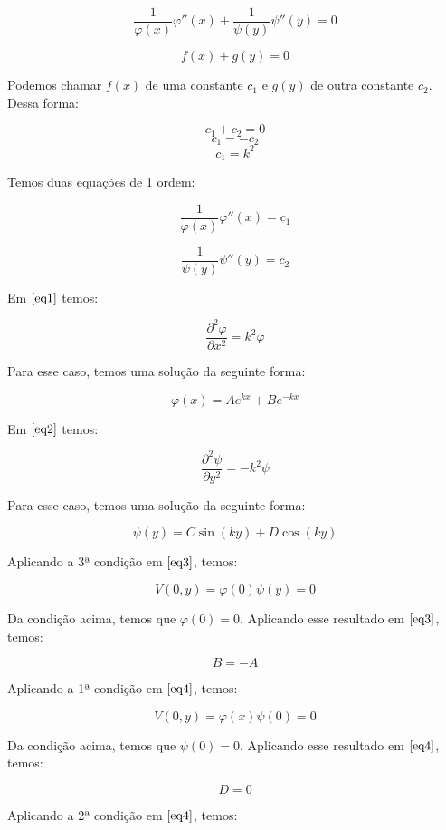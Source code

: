 \documentclass[11pt,a4paper]{article}
\begin{document}
\begin{enumerate}
\begin{enumerate}
$$\displaystyle\dfrac{1}{\varphi (x)}\varphi'' (x) + \displaystyle\dfrac{1}{\psi (y)}\psi'' (y) = 0$$

$$f(x) + g(y) = 0$$

Podemos chamar $f(x)$ de uma constante $c_1$ e $g(y)$ de outra constante $c_2$. Dessa forma:

$$c_1 + c_2 = 0$$
$$c_1 = -c_2$$
$$c_1 = k^2$$

Temos duas equações de 1 ordem:

\begin{equation}
\displaystyle\dfrac{1}{\varphi (x)}\varphi'' (x) = c_1
\label{eq1}
\end{equation}

\begin{equation}
\displaystyle\dfrac{1}{\psi (y)}\psi'' (y) = c_2
\label{eq2}
\end{equation}

Em $\ref{eq1}$ temos:

$$\displaystyle\dfrac{\partial ^2 \varphi}{\partial x^2} = k^2\varphi$$

Para esse caso, temos uma solução da seguinte forma:

\begin{equation}
\varphi (x) = A e^{kx} + B e^{-kx}
\label{eq3}
\end{equation}

Em $\ref{eq2}$ temos:

$$\displaystyle\dfrac{\partial ^2 \psi}{\partial y^2} = - k^2\psi$$

Para esse caso, temos uma solução da seguinte forma:

\begin{equation}
\psi (y) = C \sin(ky) + D \cos(ky)
\label{eq4}
\end{equation}

Aplicando a 3ª condição em $\ref{eq3}$, temos:

$$V(0,y) = \varphi (0) \psi (y) = 0$$

Da condição acima, temos que $\varphi (0) = 0$. Aplicando esse resultado em $\ref{eq3}$, temos:

$$B = -A$$

Aplicando a 1ª condição em $\ref{eq4}$, temos:

$$V(0,y) = \varphi (x) \psi (0) = 0$$ 

Da condição acima, temos que $\psi (0) = 0$. Aplicando esse resultado em $\ref{eq4}$, temos:

$$D = 0$$

Aplicando a 2ª condição em $\ref{eq4}$, temos:


\end{enumerate}
\end{enumerate}
\end{document}
